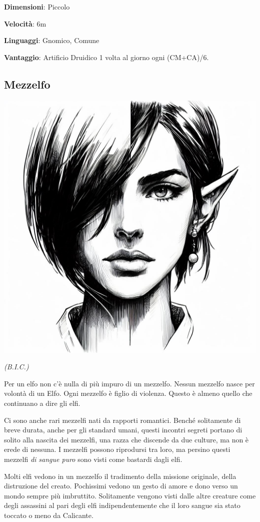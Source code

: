 \begin{multicols}{2}
\textbf{Dimensioni}: Piccolo

\textbf{Velocità}: 6m

\textbf{Linguaggi}: Gnomico, Comune

\textbf{Vantaggio}: Artificio Druidico 1 volta al giorno ogni (CM+CA)/6.


\subsection{Mezzelfo}\label{mezzelfo}


\begin{center}
\includegraphics[height=0.7\linewidth]{immagini/half-elf-ai.png}

\textit{(B.I.C.)}
\end{center}


Per un elfo non c'è nulla di più impuro di un mezzelfo. Nessun mezzelfo nasce per volontà di un Elfo. Ogni mezzelfo è figlio di violenza. Questo è almeno quello che continuano a dire gli elfi.

Ci sono anche rari mezzelfi nati da rapporti romantici. Benché solitamente di breve durata, anche per gli standard umani, questi incontri segreti portano di solito alla nascita dei mezzelfi, una razza che discende da due culture, ma non è erede di nessuna. I mezzelfi possono riprodursi tra loro, ma persino questi mezzelfi \emph{di sangue puro} sono visti come bastardi dagli elfi.

Molti elfi vedono in un mezzelfo il tradimento della missione originale, della distruzione del creato.
Pochissimi vedono un gesto di amore e dono verso un mondo sempre più imbruttito.
Solitamente vengono visti dalle altre creature come degli assassini al pari degli elfi indipendentemente che il loro sangue sia stato toccato o meno da Calicante.


\end{multicols}
